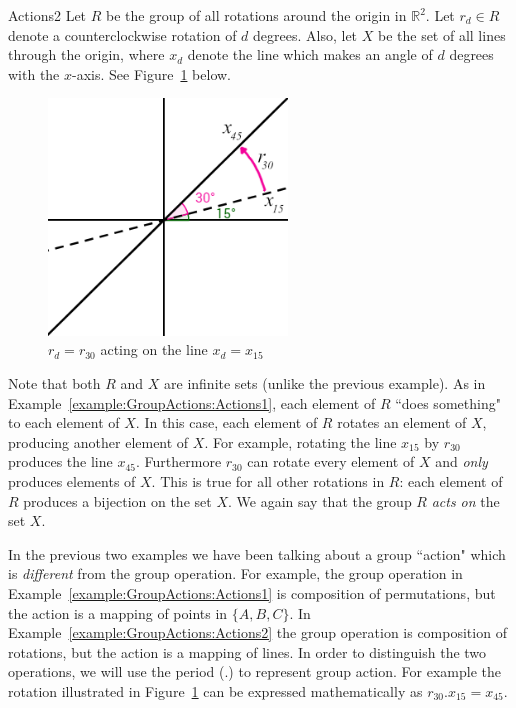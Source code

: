 \begin{example}{Actions2} Let $R$ be the group of all rotations around the origin in $\mathbb{R}^2$. Let $r_d\in R$ denote a counterclockwise rotation of $d$ degrees. Also, let $X$ be the set of all lines through the origin, where $x_d$ denote the line which makes an angle of $d$ degrees with the $x$-axis. See Figure~\ref{fig:rotate_line} below.

\begin{figure}[htbp]
\begin{center}
\includegraphics[width=2.5in]{images/rotate_line.png}
\caption{$r_d=r_{30}$ acting on the line $x_d=x_{15}$}\label{fig:rotate_line}
\end{center}
\end{figure}

Note that both $R$ and $X$ are infinite sets (unlike the previous example). As in Example~\ref{example:GroupActions:Actions1}, each element of $R$ ``does something" to each element of $X$. In this case, each element of $R$ rotates an element of $X$, producing another element of $X$. For example, rotating the line $x_{15}$ by $r_{30}$ produces the line $x_{45}$. Furthermore $r_{30}$ can rotate every element of $X$ and \emph{only} produces elements of $X$. This is true for all other rotations in $R$: each element of $R$ produces a bijection on the set $X$. We again say that the group $R$ \emph{acts on} the set $X$.
\end {example}

In the previous two examples we have been talking about a group ``action" which is \emph{different} from the group operation.  For example, the group operation in Example~\ref{example:GroupActions:Actions1} is composition of permutations, but the action is a mapping of points in $\{A,B,C\}$. In Example~\ref{example:GroupActions:Actions2} the group operation is composition of rotations, but the action is a mapping of lines. In order to distinguish the two operations, we will use the period (.) to represent group action. For example the rotation illustrated in Figure~\ref{fig:rotate_line} can be expressed mathematically as $r_{30}.x_{15}=x_{45}$.

